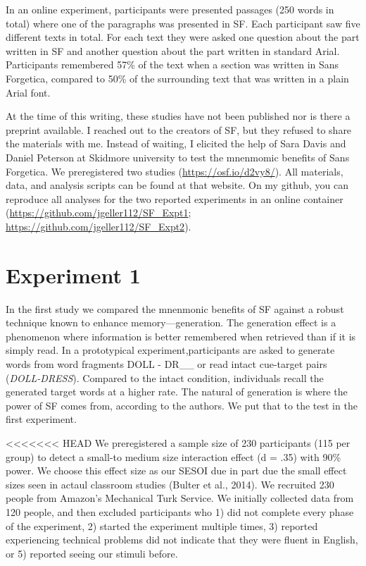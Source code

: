\documentclass[]{article}
\begin{document}
In an online experiment, participants were presented passages (250 words
in total) where one of the paragraphs was presented in SF. Each
participant saw five different texts in total. For each text they were
asked one question about the part written in SF and another question
about the part written in standard Arial. Participants remembered 57\%
of the text when a section was written in Sans Forgetica, compared to
50\% of the surrounding text that was written in a plain Arial font.

At the time of this writing, these studies have not been published nor
is there a preprint available. I reached out to the creators of SF, but
they refused to share the materials with me. Instead of waiting, I
elicited the help of Sara Davis and Daniel Peterson at Skidmore
university to test the mnenmomic benefits of Sans Forgetica. We
preregistered two studies (\url{https://osf.io/d2vy8/}). All materials,
data, and analysis scripts can be found at that website. On my github,
you can reproduce all analyses for the two reported experiments in an
online container (\url{https://github.com/jgeller112/SF_Expt1};
\url{https://github.com/jgeller112/SF_Expt2}).

\hypertarget{experiment-1}{%
\section{Experiment 1}\label{experiment-1}}

In the first study we compared the mnenmonic benefits of SF against a
robust technique known to enhance memory---generation. The generation
effect is a phenomenon where information is better remembered when
retrieved than if it is simply read. In a prototypical
experiment,participants are asked to generate words from word fragments
DOLL - DR\_\_ or read intact cue-target pairs (\emph{DOLL-DRESS}).
Compared to the intact condition, individuals recall the generated
target words at a higher rate. The natural of generation is where the
power of SF comes from, according to the authors. We put that to the
test in the first experiment.

\textless{}\textless{}\textless{}\textless{}\textless{}\textless{}\textless{}
HEAD We preregistered a sample size of 230 participants (115 per group)
to detect a small-to medium size interaction effect (d = .35) with 90\%
power. We choose this effect size as our SESOI due in part due the small
effect sizes seen in actaul classroom studies (Bulter et al., 2014). We
recruited 230 people from Amazon's Mechanical Turk Service. We initially
collected data from 120 people, and then excluded participants who 1)
did not complete every phase of the experiment, 2) started the
experiment multiple times, 3) reported experiencing technical problems
did not indicate that they were fluent in English, or 5) reported seeing
our stimuli before.
\end{document}
